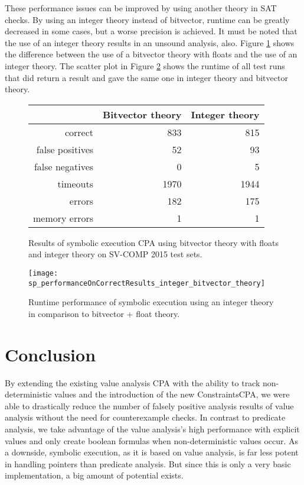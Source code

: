These performance issues can be improved by using another theory in SAT checks.
By using an integer theory instead of bitvector, runtime can be greatly decreased in some cases, but a worse precision is achieved.
It must be noted that the use of an integer theory results in an unsound analysis, also. Figure \ref{tab:bitvecIntComp} shows the difference between the use of a bitvector theory with floats and the use of an integer theory.
The scatter plot in Figure \ref{graph:bitvecIntComp} shows the runtime of all test runs that did return a result and gave the same one in integer theory and bitvector theory.
\begin{figure}
\begin{tabular}{| r || r | r |}
\hline
& Bitvector theory & Integer theory \\ \hline
correct         &  833 &  815 \\ \hline
false positives &   52 &   93 \\ \hline
false negatives &    0 &    5 \\ \hline
timeouts        & 1970 & 1944 \\ \hline
errors          &  182 &  175 \\ \hline
memory errors   &    1 &    1 \\ \hline
\end{tabular}
\label{tab:bitvecIntComp}
\caption{Results of symbolic execution CPA using bitvector theory with floats and integer theory on SV-COMP 2015 test sets.}
\end{figure}

\begin{figure}
\texttt{[image: sp\_performanceOnCorrectResults\_integer\_bitvector\_theory]}
\label{graph:bitvecIntComp}
\caption{Runtime performance of symbolic execution using an integer theory in comparison to bitvector + float theory.}
\end{figure}

\section{Conclusion}
By extending the existing value analysis CPA with the ability to track non-deterministic values and the introduction of the new ConstraintsCPA,
we were able to drastically reduce the number of falsely positive analysis results of value analysis without the need for counterexample checks.
In contrast to predicate analysis, we take advantage of the value analysis's high performance with explicit values and only create boolean formulas when non-deterministic values occur.
As a downside, symbolic execution, as it is based on value analysis, is far less potent in handling pointers than predicate analysis.
But since this is only a very basic implementation, a big amount of potential exists.

